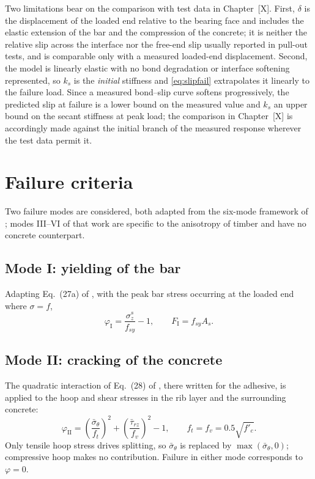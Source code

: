 Two limitations bear on the comparison with test data in Chapter~[X]. First,
$\delta$ is the displacement of the loaded end relative to the bearing face
and includes the elastic extension of the bar and the compression of the
concrete; it is neither the relative slip across the interface nor the
free-end slip usually reported in pull-out tests, and is comparable only with
a measured loaded-end displacement. Second, the model is linearly elastic with
no bond degradation or interface softening represented, so $k_s$ is the
\emph{initial} stiffness and \eqref{eq:slipfail} extrapolates it linearly to
the failure load. Since a measured bond--slip curve softens progressively, the
predicted slip at failure is a lower bound on the measured value and $k_s$ an
upper bound on the secant stiffness at peak load; the comparison in
Chapter~[X] is accordingly made against the initial branch of the measured
response wherever the test data permit it.
\par
\endgroup

\section{Failure criteria}
\label{sec:failure}

Two failure modes are considered, both adapted from the six-mode framework of
\textcite{alaviAnalyticalProcedureFailure2025}; modes III--VI of that work are
specific to the anisotropy of timber and have no concrete counterpart.

\subsection{Mode I: yielding of the bar}
\label{sec:modeI}

Adapting Eq.~(27a) of \textcite{alaviAnalyticalProcedureFailure2025}, with the
peak bar stress occurring at the loaded end where $\sigma = f$,
\begin{equation}
\label{eq:modeI}
\varphi_{\mathrm{I}} = \frac{\sigma_z^{s}}{f_{sy}} - 1,
\qquad F_{\mathrm{I}} = f_{sy} A_s .
\end{equation}

\subsection{Mode II: cracking of the concrete}
\label{sec:modeII}
 
The quadratic interaction of Eq.~(28) of
\textcite{alaviAnalyticalProcedureFailure2025}, there written for the
adhesive, is applied to the hoop and shear stresses in the rib layer and the
surrounding concrete:
\begin{equation}
\label{eq:modeII}
\varphi_{\mathrm{II}} =
  \left(\frac{\bar{\sigma}_\theta}{f_t}\right)^{2}
+ \left(\frac{\bar{\tau}_{rz}}{f_v}\right)^{2} - 1,
\qquad f_t = f_v = 0.5\sqrt{f'_c} .
\end{equation}
Only tensile hoop stress drives splitting, so $\bar{\sigma}_\theta$ is
replaced by $\max(\bar{\sigma}_\theta, 0)$; compressive hoop makes no
contribution. Failure in either mode corresponds to $\varphi = 0$.
 

